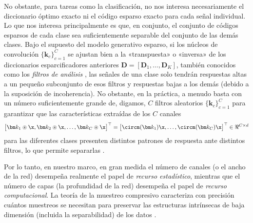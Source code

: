 \documentclass[../../book-main.tex]{subfiles}
\begin{document}
No obstante, para tareas como la clasificación, no nos
interesa necesariamente el diccionario óptimo exacto ni el
código esparso exacto para cada señal individual. Lo que nos
interesa principalmente es que, en conjunto, el conjunto de códigos esparsos de cada clase sea
suficientemente separable del conjunto de las demás clases. Bajo el
supuesto del modelo generativo esparso, si los núcleos de convolución
$\{\bm k_c\}_{c=1}^C$  se ajustan bien a la «transpuesta» o
«inversa» de los diccionarios esparcificadores anteriores $\bm D = [\bm D_1,
\ldots, \bm D_K]$, también conocidos como los {\em filtros de análisis}
\cite{Cosparse-Nam,Analysis-Filter}, las señales de una clase solo
tendrán respuestas altas a un pequeño subconjunto de esos filtros y respuestas bajas
a los demás (debido a la suposición de incoherencia).
No obstante, en la práctica, a menudo basta con un número suficientemente grande de, digamos,
$C$ filtros aleatorios $\{\bm k_c\}_{c=1}^C$ para garantizar que las
características extraídas de los $C$ canales
\begin{equation}
    \big[\bm k_1 \circledast \x, \bm k_2 \circledast \x, \ldots, \bm
    k_C \circledast \x\big]^\top = \big[\circm(\bm k_1) \x, \ldots,
    \circm(\bm k_C) \x \big]^\top \in \Re^{C\times d}
\end{equation}
para las diferentes clases presenten distintos patrones de respuesta ante distintos
filtros, lo que permite separarlas \cite{chan2015pcanet}.

Por lo tanto, en nuestro marco, en gran medida el número de canales
(o el ancho de la red) desempeña realmente el papel de  {\em
recurso estadístico}, mientras que el número de capas (la profundidad de la
red) desempeña el papel de {\em recurso computacional}. La
teoría de la muestreo compresivo caracteriza con precisión cuántos
muestreos se necesitan para preservar las estructuras intrínsecas
de baja dimensión (incluida la separabilidad) de los datos
\cite{Wright-Ma-2022}. %
\end{document}
